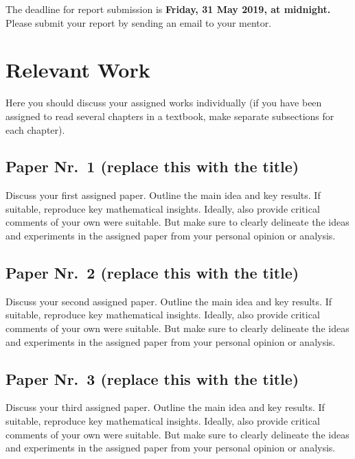 \documentclass{article}
\begin{document}
\begin{center}
The deadline for report submission is \textbf{Friday, 31 May 2019, at midnight.}\\
Please submit your report by sending an email to your mentor.
\end{center}

\section{Relevant Work}

Here you should discuss your assigned works individually (if you have been assigned to read several chapters in a textbook, make separate subsections for each chapter).

\subsection{Paper Nr.~1 (replace this with the title)}

Discuss your first assigned paper. Outline the main idea and key results. If suitable, reproduce key mathematical insights. Ideally, also provide critical comments of your own were suitable. But make sure to clearly delineate the ideas and experiments in the assigned paper from your personal opinion or analysis.

\subsection{Paper Nr.~2 (replace this with the title)}

Discuss your second assigned paper. Outline the main idea and key results. If suitable, reproduce key mathematical insights. Ideally, also provide critical comments of your own were suitable. But make sure to clearly delineate the ideas and experiments in the assigned paper from your personal opinion or analysis.

\subsection{Paper Nr.~3 (replace this with the title)}

Discuss your third assigned paper. Outline the main idea and key results. If suitable, reproduce key mathematical insights. Ideally, also provide critical comments of your own were suitable. But make sure to clearly delineate the ideas and experiments in the assigned paper from your personal opinion or analysis.
\end{document}
